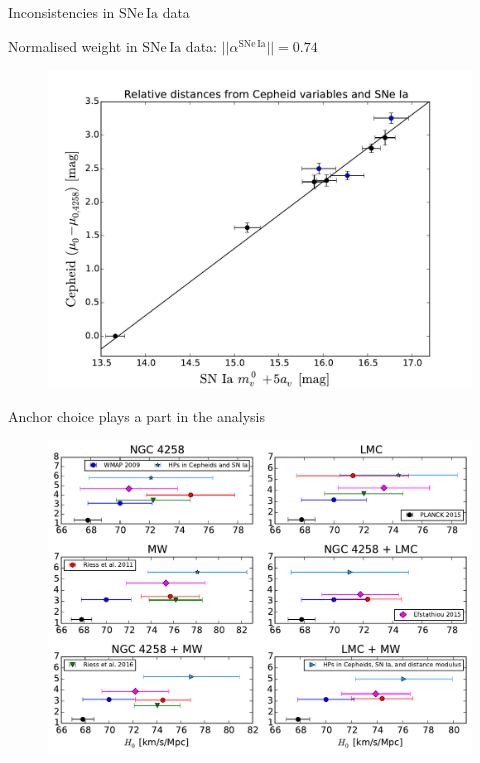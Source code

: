 \documentclass{beamer}
\newcommand{\SNe}{\mathrm{SNe\,Ia}}
\begin{document}
\begin{frame}{Inconsistencies in $\SNe$ data}
\begin{center}
Normalised weight in $\SNe$ data: $|| \alpha^{\SNe}|| = 0.74 $
\end{center}
\begin{figure}
\includegraphics[scale=0.45]{../figures/chapter-h0/effective_HP_SNIa.pdf} 
\end{figure}
\end{frame}

\begin{frame}{Anchor choice plays a part in the analysis}
\begin{figure}
\includegraphics[scale=0.5]{../figures/chapter-h0/H0_values_anchor_combination.pdf} 
\end{figure}
\end{frame}
\end{document}
